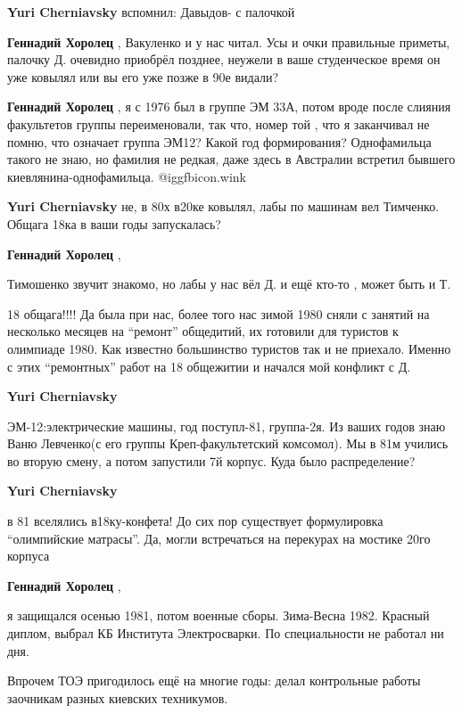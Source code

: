 \begin{itemize}
\begin{itemize}
\begin{itemize}
\textbf{Yuri Cherniavsky} вспомнил: Давыдов- с палочкой

\textbf{Геннадий Хоролец} , Вакуленко и у нас читал. Усы и очки правильные приметы, палочку Д. очевидно приобрёл позднее, неужели в ваше студенческое время он уже ковылял или вы его уже позже в 90е видали?

\textbf{Геннадий Хоролец} , я с 1976 был в группе ЭМ 33А, потом вроде после слияния факультетов группы переименовали, так что, номер той , что я заканчивал не помню, что означает группа ЭМ12? Какой год формирования? Однофамильца такого не знаю, но фамилия не редкая, даже здесь в Австралии встретил бывшего киевлянина-однофамильца.  @igg{fbicon.wink} 

\textbf{Yuri Cherniavsky} не, в 80х в20ке ковылял, лабы по машинам вел Тимченко. Общага 18ка в ваши годы запускалась?

\textbf{Геннадий Хоролец} , 

Тимошенко звучит знакомо, но лабы у нас вёл Д. и ещё кто-то , может быть и Т.

18 общага!!!! Да была при нас, более того нас зимой 1980 сняли с занятий на
несколько месяцев на \enquote{ремонт} общедитий, их готовили для туристов к олимпиаде
1980. Как известно большинство туристов так и не приехало. Именно с этих
\enquote{ремонтных} работ на 18 общежитии и начался мой конфликт с Д.

\textbf{Yuri Cherniavsky} 

ЭМ-12:электрические машины, год поступл-81, группа-2я. Из ваших годов знаю Ваню
Левченко(с его группы Креп-факультетский комсомол). Мы в 81м учились во вторую
смену, а потом запустили 7й корпус. Куда было распределение?

\textbf{Yuri Cherniavsky} 

в 81 вселялись в18ку-конфета! До сих пор существует формулировка \enquote{олимпийские
матрасы}. Да, могли встречаться на перекурах на мостике 20го корпуса


\textbf{Геннадий Хоролец} , 

я защищался осенью 1981, потом военные сборы. Зима-Весна 1982. Красный диплом,
выбрал КБ Института Электросварки. По специальности не работал ни дня.

Впрочем ТОЭ пригодилось ещё на многие годы: делал контрольные работы заочникам
разных киевских техникумов.



\end{itemize}
\end{itemize}
\end{itemize}
